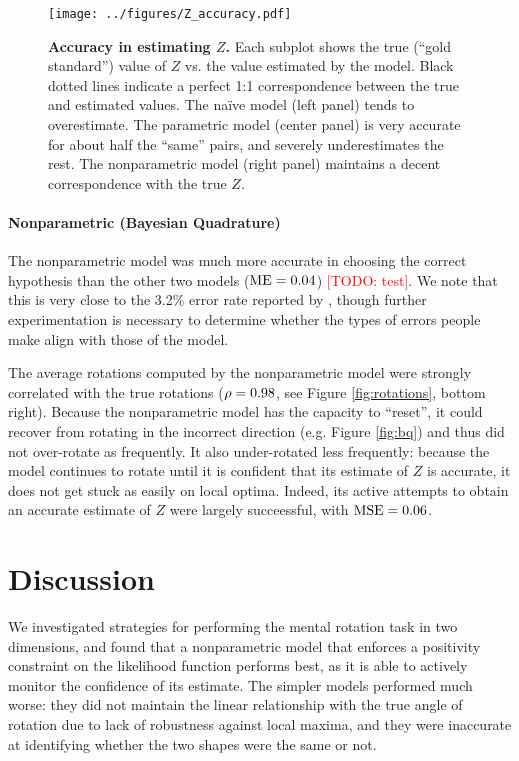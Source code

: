 \documentclass{article} %
\newcommand{\TODO}[1]{\textcolor{red}{[TODO: #1]}}
\newcommand{\naive}[0]{na\"ive}
\begin{document}
\begin{figure}[t]
  \centering
  \texttt{[image: ../figures/Z\_accuracy.pdf]}
  \caption{\textbf{Accuracy in estimating $Z$.} Each subplot shows the
    true (``gold standard'') value of $Z$ vs. the value estimated by
    the model. Black dotted lines indicate a perfect 1:1
    correspondence between the true and estimated values. The \naive{}
    model (left panel) tends to overestimate. The parametric model
    (center panel) is very accurate for about half the ``same'' pairs,
    and severely underestimates the rest. The nonparametric model
    (right panel) maintains a decent correspondence with the true
    $Z$.}
  \label{fig:accuracy}
\end{figure}


\paragraph{Nonparametric (Bayesian Quadrature)}

The nonparametric model was much more accurate in choosing the correct
hypothesis than the other two models ($\mathrm{ME}{}=0.04{}$) \TODO{test}. We note
that this is very close to the 3.2\% error rate reported by
\cite{Shepard1971}, though further experimentation is necessary to
determine whether the types of errors people make align with those of
the model.

The average rotations computed by the nonparametric model were
strongly correlated with the true rotations ($\rho=0.98$, see Figure
\ref{fig:rotations}, bottom right). Because the nonparametric model
has the capacity to ``reset'', it could recover from rotating in the
incorrect direction (e.g. Figure \ref{fig:bq}) and thus did not
over-rotate as frequently.  It also under-rotated less frequently:
because the model continues to rotate until it is confident that its
estimate of $Z$ is accurate, it does not get stuck as easily on local
optima.  Indeed, its active attempts to obtain an accurate estimate of
$Z$ were largely succeessful, with $\mathrm{MSE}{}=0.06{}$.


\section{Discussion}

We investigated strategies for performing the mental rotation task
\cite{Shepard1971} in two dimensions, and found that a nonparametric
model that enforces a positivity constraint on the likelihood function
performs best, as it is able to actively monitor the confidence of its
estimate. The simpler models performed much worse: they did not
maintain the linear relationship with the true angle of rotation due
to lack of robustness against local maxima, and they were inaccurate
at identifying whether the two shapes were the same or not.
\end{document}
